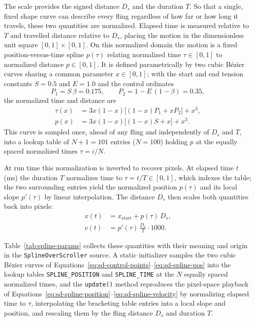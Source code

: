 \documentclass[12pt,a4paper]{report}
\begin{document}
        The scale provides the signed distance $D_s$ and the duration $T$. So that a single, fixed shape curve can describe every fling regardless of how far or how long it travels, these two quantities are normalized. Elapsed time is measured relative to $T$ and travelled distance relative to $D_s$, placing the motion in the dimensionless unit square $[0,1]\times[0,1]$. On this normalized domain the motion is a fixed position-versus-time spline $p(\tau)$ relating normalized time $\tau \in [0,1]$ to normalized distance $p \in [0,1]$. It is defined parametrically by two cubic B\'ezier curves sharing a common parameter $x \in [0,1]$; with the start and end tension constants $S = 0.5$ and $E = 1.0$ and the control ordinates
        \begin{equation}
        P_1 = S\,\beta = 0.175,
        \qquad
        P_2 = 1 - E\,(1-\beta) = 0.35,
        \label{eq:sd-control-points}
        \end{equation}
        the normalized time and distance are
        \begin{align}
        \tau(x) &= 3x(1-x)\big[(1-x)P_1 + x P_2\big] + x^3, \label{eq:sd-spline-time}\\
        p(x)    &= 3x(1-x)\big[(1-x)S + x\big] + x^3. \label{eq:sd-spline-pos}
        \end{align}
        This curve is sampled once, ahead of any fling and independently of $D_s$ and $T$, into a lookup table of $N+1 = 101$ entries ($N = 100$) holding $p$ at the equally spaced normalized times $\tau = i/N$.

        At run time this normalization is inverted to recover pixels. At elapsed time $t$ (ms) the duration $T$ normalizes time to $\tau = t/T \in [0,1]$, which indexes the table; the two surrounding entries yield the normalized position $p(\tau)$ and its local slope $p'(\tau)$ by linear interpolation. The distance $D_s$ then scales both quantities back into pixels:
        \begin{align}
        x(t) &= x_{\text{start}} + p(\tau)\,D_s, \label{eq:sd-spline-position}\\[2pt]
        v(t) &= p'(\tau)\,\frac{D_s}{T}\cdot 1000. \label{eq:sd-spline-velocity}
        \end{align}

        Table~\ref{tab:spline-params} collects these quantities with their meaning and origin in the \texttt{SplineOverScroller} source. A static initializer samples the two cubic B\'ezier curves of Equations~\eqref{eq:sd-control-points}--\eqref{eq:sd-spline-pos} into the lookup tables \texttt{SPLINE\_POSITION} and \texttt{SPLINE\_TIME} at the $N$ equally spaced normalized times, and the \texttt{update()} method reproduces the pixel-space playback of Equations~\eqref{eq:sd-spline-position}--\eqref{eq:sd-spline-velocity} by normalizing elapsed time to $\tau$, interpolating the bracketing table entries into a local slope and position, and rescaling them by the fling distance $D_s$ and duration $T$.
\end{document}
